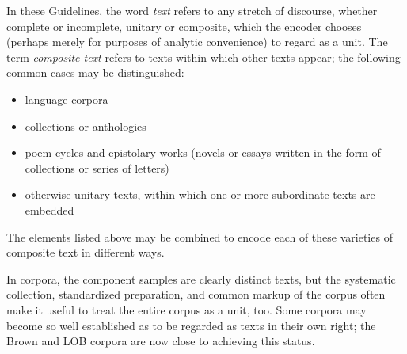 In these Guidelines, the word \textit{text} refers to any stretch of discourse, whether complete or incomplete, unitary or composite, which the encoder chooses (perhaps merely for purposes of analytic convenience) to regard as a unit. The term \textit{composite text} refers to texts within which other texts appear; the following common cases may be distinguished: \begin{itemize}
\item language corpora
\item collections or anthologies
\item poem cycles and epistolary works (novels or essays written in the form of collections or series of letters)
\item otherwise unitary texts, within which one or more subordinate texts are embedded
\end{itemize}  The elements listed above may be combined to encode each of these varieties of composite text in different ways.\par
In corpora, the component samples are clearly distinct texts, but the systematic collection, standardized preparation, and common markup of the corpus often make it useful to treat the entire corpus as a unit, too. Some corpora may become so well established as to be regarded as texts in their own right; the Brown and LOB corpora are now close to achieving this status. \par
